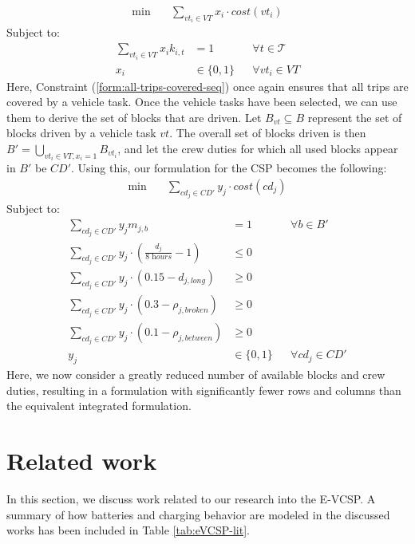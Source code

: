 \documentclass[]{article}
\begin{document}
\begin{align}
\min \quad
& \sum_{vt_i \in VT} x_{i} \cdot cost(vt_i)
\end{align}
Subject to:
\begin{align}
\sum_{vt_i \in VT} x_{i}k_{i,t} &= 1 && \forall t \in \mathcal{T} \label{form:all-trips-covered-seq} \\
x_{i} &\in \{ 0, 1 \} && \forall vt_i \in VT
\end{align}
Here, Constraint (\ref{form:all-trips-covered-seq}) once again ensures that all trips are covered by a vehicle task. Once the vehicle tasks have been selected, we can use them to derive the set of blocks that are driven. Let $B_{vt} \subseteq B$ represent the set of blocks driven by a vehicle task $vt$. The overall set of blocks driven is then $B' = \bigcup_{vt_i \in VT, x_i = 1}B_{vt_i}$, and let the crew duties for which all used blocks appear in $B'$ be $CD'$. Using this, our formulation for the CSP becomes the following:
\begin{align}
\min \quad
& \sum_{cd_j \in CD'} y_{j} \cdot cost(cd_j)  
\end{align}
Subject to:
\begin{align}
\sum_{cd_j \in CD'} y_j m_{j,b} &= 1  && \forall b \in B' \label{form:all-blocks-covered-seq} \\
\sum_{cd_j \in CD'} y_{j} \cdot (\frac{d_{j}}{\textit{8 hours}} - 1) &\leq 0 && \\
\sum_{cd_j \in CD'} y_{j} \cdot (0.15 - d_{j,\textit{long}}) &\geq 0 && \\
\sum_{cd_j \in CD'} y_{j} \cdot (0.3 - \rho_{j,\textit{broken}}) &\geq 0 && \\
\sum_{cd_j \in CD'} y_{j} \cdot (0.1 - \rho_{j,\textit{between}}) &\geq 0 && \\
y_{j} &\in \{ 0, 1 \} && \forall cd_j \in CD'
\end{align}
Here, we now consider a greatly reduced number of available blocks and crew duties, resulting in a formulation with significantly fewer rows and columns than the equivalent integrated formulation.

\section{Related work}
In this section, we discuss work related to our research into the E-VCSP. A summary of how batteries and charging behavior are modeled in the discussed works has been included in Table \ref{tab:eVCSP-lit}.
\end{document}
